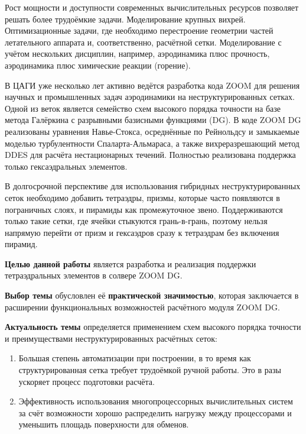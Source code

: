 

Рост мощности и доступности современных вычислительных ресурсов позволяет решать более трудоёмкие задачи. Моделирование крупных вихрей. Оптимизационные задачи, где необходимо перестроение геометрии частей летательного аппарата и, соответственно, расчётной сетки. Моделирование с учётом нескольких дисциплин, например, аэродинамика плюс прочность, аэродинамика плюс химические реакции (горение).

В ЦАГИ уже несколько лет активно ведётся разработка кода ZOOM для решения научных и промышленных задач аэродинамики на неструктурированных сетках. Одной из веток является семейство схем высокого порядка точности на базе метода Галёркина с разрывными базисными функциями (DG). В коде ZOOM DG реализованы уравнения Навье-Стокса, осреднённые по Рейнольдсу и замыкаемые моделью турбулентности Спаларта-Альмараса, а также вихреразрешающий метод DDES для расчёта нестационарных течений. Полностью реализована поддержка только гексаэдральных элементов.

В долгосрочной перспективе для использования гибридных неструктурированных сеток необходимо добавить тетраэдры, призмы, которые часто появляются в пограничных слоях, и пирамиды как промежуточное звено. Поддерживаются только такие сетки, где ячейки стыкуются грань-в-грань, поэтому нельзя напрямую перейти от призм и гексаэдров сразу к тетраэдрам без включения пирамид.

\textbf{Целью данной работы} является разработка и реализация поддержки тетраэдральных элементов в солвере ZOOM DG.

\textbf{Выбор темы} обусловлен её \textbf{практической значимостью}, которая заключается в расширении функциональных возможностей расчётного модуля ZOOM DG.

\textbf{Актуальность темы} определяется применением схем высокого порядка точности и преимуществами неструктурированных расчётных сеток:
\begin{enumerate}
	\item Большая степень автоматизации при построении, в то время как структурированная сетка требует трудоёмкой ручной работы. Это в разы ускоряет процесс подготовки расчёта.
	\item Эффективность использования многопроцессорных вычислительных систем за счёт возможности хорошо распределить нагрузку между процессорами и уменьшить площадь поверхности для обменов.
\end{enumerate}

